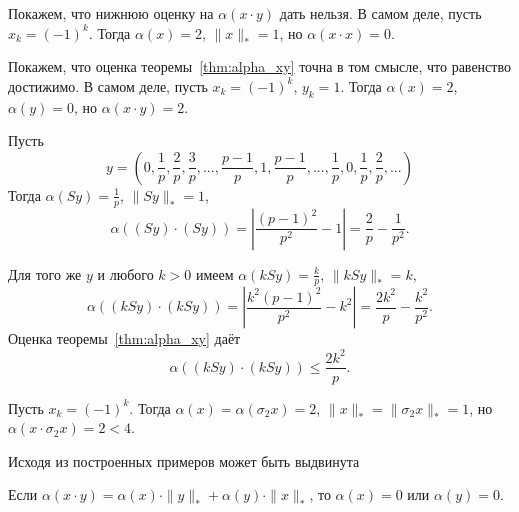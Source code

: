 \begin{example}
	Покажем, что нижнюю оценку на $\alpha(x\cdot y)$ дать нельзя.
	В самом деле,
	пусть $x_k = (-1)^k$.
	Тогда $\alpha(x) = 2$, $\|x\|_* = 1$,
	но $\alpha(x\cdot x) = 0$.
\end{example}

\begin{example}
	\label{ex:alpha-c_not_ideal}
	Покажем, что оценка теоремы~\ref{thm:alpha_xy} точна в том смысле,
	что равенство достижимо.
	В самом деле,
	пусть $x_k = (-1)^k$, $y_k = 1$.
	Тогда $\alpha(x) = 2$, $\alpha(y) = 0$,
	но $\alpha(x\cdot y) = 2$.
\end{example}

\begin{example}
	Пусть
	\begin{equation}\label{y_construction}
		y = \left(
			0, \frac{1}{p}, \frac{2}{p}, \frac{3}{p},
			...,
			\frac{p-1}{p}, 1, \frac{p-1}{p},
			...,
			\frac{1}{p},
			0,
			\frac{1}{p}, \frac{2}{p}, ...
		\right)
	\end{equation}
	Тогда $\alpha(Sy) = \frac{1}{p}$, $\|Sy\|_* = 1$,
	\begin{equation}
		\alpha((Sy)\cdot(Sy)) =
		\left| \frac{(p-1)^2}{p^2} - 1 \right| =
		\frac{2}{p}-\frac{1}{p^2}
		.
	\end{equation}
\end{example}

\begin{example}
	Для того же $y$ и любого $k>0$ имеем
	$\alpha(kSy) = \frac{k}{p}$, $\|kSy\|_* = k$,
	\begin{equation}
		\alpha((kSy)\cdot(kSy)) =
		\left| \frac{k^2(p-1)^2}{p^2} - k^2 \right| =
		\frac{2k^2}{p}-\frac{k^2}{p^2}
		.
	\end{equation}
	Оценка теоремы~\ref{thm:alpha_xy} даёт
	\begin{equation}
		\alpha((kSy)\cdot(kSy)) \leq
		\frac{2k^2}{p}
		.
	\end{equation}
\end{example}



\begin{example}
	Пусть $x_k = (-1)^k$.
	Тогда $\alpha(x) = \alpha(\sigma_2 x) = 2$, $\|x\|_* = \|\sigma_2 x\|_* = 1$,
	но $\alpha(x\cdot \sigma_2 x) = 2 < 4$.
\end{example}

Исходя из построенных примеров может быть выдвинута
\begin{hypothesis}
	Если $\alpha(x\cdot y)= \alpha(x)\cdot \|y\|_* + \alpha(y)\cdot \|x\|_*$,
	то $\alpha(x) = 0$ или $\alpha(y) = 0$.
\end{hypothesis}

